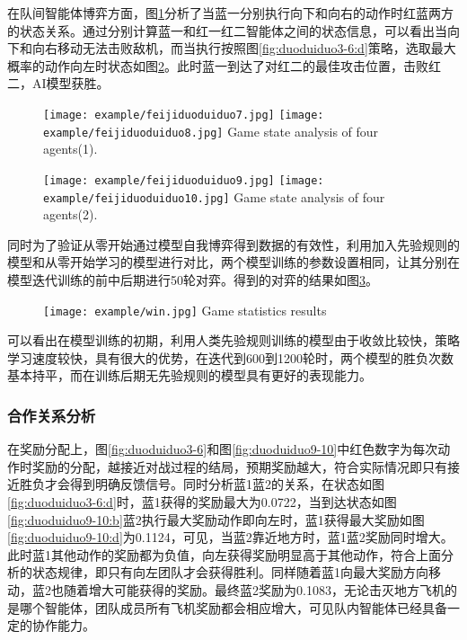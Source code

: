 在队间智能体博弈方面，图\ref{fig2:duoduiduo}分析了当蓝一分别执行向下和向右的动作时红蓝两方的状态关系。通过分别计算蓝一和红一红二智能体之间的状态信息，可以看出当向下和向右移动无法击败敌机，而当执行按照图\ref{fig:duoduiduo3-6:d}策略，选取最大概率的动作向左时状态如图\ref{fig3:duoduiduo}。此时蓝一到达了对红二的最佳攻击位置，击败红二，AI模型获胜。
\begin{figure}[!hpbt]
	\centering
	{\texttt{[image: example/feijiduoduiduo7.jpg]}}
	\hspace{0.5em}
	{\texttt{[image: example/feijiduoduiduo8.jpg]}}
	{Game state analysis of four agents(1).}
	\label{fig2:duoduiduo}
\end{figure}
\begin{figure}[hpbt]
	\centering
	{\texttt{[image: example/feijiduoduiduo9.jpg]}}
	\hspace{0.5em}
	{\texttt{[image: example/feijiduoduiduo10.jpg]}}
	{Game state analysis of four agents(2).}
	\label{fig3:duoduiduo}
\end{figure}


同时为了验证从零开始通过模型自我博弈得到数据的有效性，利用加入先验规则的模型和从零开始学习的模型进行对比，两个模型训练的参数设置相同，让其分别在模型迭代训练的前中后期进行50轮对弈。得到的对弈的结果如图\ref{fig:win}。

\begin{figure}[!hbtp]
	\centering
	\texttt{[image: example/win.jpg]}
	{Game statistics results}
	\label{fig:win}
\end{figure}

可以看出在模型训练的初期，利用人类先验规则训练的模型由于收敛比较快，策略学习速度较快，具有很大的优势，在迭代到600到1200轮时，两个模型的胜负次数基本持平，而在训练后期无先验规则的模型具有更好的表现能力。
\subsubsection{合作关系分析}
在奖励分配上，图\ref{fig:duoduiduo3-6}和图\ref{fig:duoduiduo9-10}中红色数字为每次动作时奖励的分配，越接近对战过程的结局，预期奖励越大，符合实际情况即只有接近胜负才会得到明确反馈信号。同时分析蓝1蓝2的关系，在状态如图\ref{fig:duoduiduo3-6:d}时，蓝1获得的奖励最大为0.0722，当到达状态如图\ref{fig:duoduiduo9-10:b}蓝2执行最大奖励动作即向左时，蓝1获得最大奖励如图\ref{fig:duoduiduo9-10:d}为0.1124，可见，当蓝2靠近地方时，蓝1蓝2奖励同时增大。此时蓝1其他动作的奖励都为负值，向左获得奖励明显高于其他动作，符合上面分析的状态规律，即只有向左团队才会获得胜利。同样随着蓝1向最大奖励方向移动，蓝2也随着增大可能获得的奖励。最终蓝2奖励为0.1083，无论击灭地方飞机的是哪个智能体，团队成员所有飞机奖励都会相应增大，可见队内智能体已经具备一定的协作能力。

